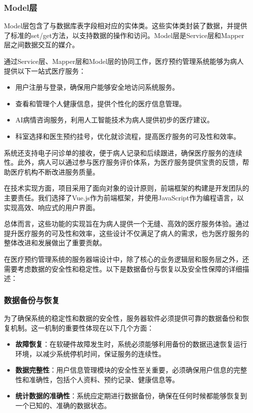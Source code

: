 \subsubsection*{Model层}
Model层包含了与数据库表字段相对应的实体类。这些实体类封装了数据，并提供了标准的set/get方法，以支持数据的操作和访问。Model层是Service层和Mapper层之间数据交互的媒介。

通过Service层、Mapper层和Model层的协同工作，医疗预约管理系统能够为病人提供以下一站式医疗服务：

\begin{itemize}
	\item 用户注册与登录，确保用户能够安全地访问系统服务。
	\item 查看和管理个人健康信息，提供个性化的医疗信息管理。
	\item AI病情咨询服务，利用人工智能技术为病人提供初步的医疗建议。
	\item 科室选择和医生预约挂号，优化就诊流程，提高医疗服务的可及性和效率。
\end{itemize}

系统还支持电子问诊单的接收，便于病人记录和后续跟进，确保医疗服务的连续性。此外，病人可以通过参与医疗服务评价体系，为医疗服务提供宝贵的反馈，帮助医疗机构不断改进服务质量。

在技术实现方面，项目采用了面向对象的设计原则，前端框架的构建是开发团队的主要责任。我们选择了Vue.js作为前端框架，并使用JavaScript作为编程语言，以实现高效、响应式的用户界面。

总体而言，这些功能的实现旨在为病人提供一个无缝、高效的医疗服务体验。通过提升医疗服务的可及性和效率，这些设计不仅满足了病人的需求，也为医疗服务的整体改进和发展做出了重要贡献。

在医疗预约管理系统的服务器端设计中，除了核心的业务逻辑层和服务层之外，还需要考虑数据的安全性和稳定性。以下是数据备份与恢复以及安全性保障的详细描述：

\subsubsection*{数据备份与恢复}
为了确保系统的稳定性和数据的安全性，服务器软件必须提供可靠的数据备份和恢复机制。这一机制的重要性体现在以下几个方面：

\begin{itemize}
	\item \textbf{故障恢复}：在软硬件故障发生时，系统必须能够利用备份的数据迅速恢复运行环境，以减少系统停机时间，保证服务的连续性。
	
	\item \textbf{数据完整性}：用户信息管理模块的安全性至关重要，必须确保用户信息的完整性和准确性，包括个人资料、预约记录、健康信息等。
	
	\item \textbf{统计数据的准确性}：系统应定期进行数据备份，确保在任何时候都能够恢复到一个已知的、准确的数据状态。
\end{itemize}

